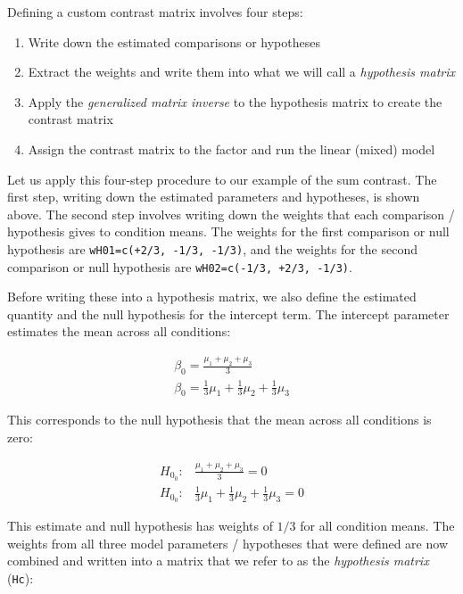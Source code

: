 \documentclass[12pt,]{krantz}
\providecommand{\tightlist}{%
  \setlength{\itemsep}{0pt}\setlength{\parskip}{0pt}}
\begin{document}
Defining a custom contrast matrix involves four steps:

\begin{enumerate}
\def\labelenumi{\arabic{enumi}.}
\tightlist
\item
  Write down the estimated comparisons or hypotheses
\item
  Extract the weights and write them into what we will call a \emph{hypothesis matrix}
\item
  Apply the \emph{generalized matrix inverse} to the hypothesis matrix to create the contrast matrix
\item
  Assign the contrast matrix to the factor and run the linear (mixed) model
\end{enumerate}

Let us apply this four-step procedure to our example of the sum contrast. The first step, writing down the estimated parameters and hypotheses, is shown above. The second step involves writing down the weights that each comparison / hypothesis gives to condition means. The weights for the first comparison or null hypothesis are \texttt{wH01=c(+2/3,\ -1/3,\ -1/3)}, and the weights for the second comparison or null hypothesis are \texttt{wH02=c(-1/3,\ +2/3,\ -1/3)}.

Before writing these into a hypothesis matrix, we also define the estimated quantity and the null hypothesis for the intercept term. The intercept parameter estimates the mean across all conditions:

\begin{align}
\beta_0 = \frac{\mu_1 + \mu_2 + \mu_3}{3} \\
\beta_0 = \frac{1}{3} \mu_1 + \frac{1}{3}\mu_2 + \frac{1}{3}\mu_3
\end{align}

This corresponds to the null hypothesis that the mean across all conditions is zero:

\begin{align}
H_{0_0}: &\frac{\mu_1 + \mu_2 + \mu_3}{3} = 0 \\
H_{0_0}: &\frac{1}{3} \mu_1 + \frac{1}{3}\mu_2 + \frac{1}{3}\mu_3 = 0
\end{align}

This estimate and null hypothesis has weights of \(1/3\) for all condition means.
The weights from all three model parameters / hypotheses that were defined are now combined and written into a matrix that we refer to as the \emph{hypothesis matrix} (\texttt{Hc}):
\end{document}
